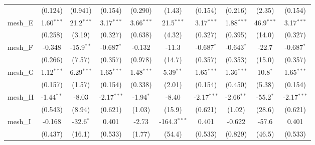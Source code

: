 \begin{tabular}{lccccccccc}
                                                               & (0.124)        & (0.941)        & (0.154)       & (0.290)       & (1.43)         & (0.154)       & (0.216)        & (2.35)        & (0.154)\\   
   mesh\_E                                                     & 1.60$^{***}$   & 21.2$^{***}$   & 3.17$^{***}$  & 3.66$^{***}$  & 21.5$^{***}$   & 3.17$^{***}$  & 1.88$^{***}$   & 46.9$^{***}$  & 3.17$^{***}$\\   
                                                               & (0.258)        & (3.19)         & (0.327)       & (0.638)       & (4.32)         & (0.327)       & (0.395)        & (14.0)        & (0.327)\\   
   mesh\_F                                                     & -0.348         & -15.9$^{**}$   & -0.687$^{*}$  & -0.132        & -11.3          & -0.687$^{*}$  & -0.643$^{*}$   & -22.7         & -0.687$^{*}$\\   
                                                               & (0.266)        & (7.57)         & (0.357)       & (0.978)       & (14.7)         & (0.357)       & (0.353)        & (15.0)        & (0.357)\\   
   mesh\_G                                                     & 1.12$^{***}$   & 6.29$^{***}$   & 1.65$^{***}$  & 1.48$^{***}$  & 5.39$^{**}$    & 1.65$^{***}$  & 1.36$^{***}$   & 10.8$^{*}$    & 1.65$^{***}$\\   
                                                               & (0.157)        & (1.57)         & (0.154)       & (0.338)       & (2.01)         & (0.154)       & (0.450)        & (5.38)        & (0.154)\\   
   mesh\_H                                                     & -1.44$^{**}$   & -8.03          & -2.17$^{***}$ & -1.94$^{*}$   & -8.40          & -2.17$^{***}$ & -2.66$^{**}$   & -55.2$^{*}$   & -2.17$^{***}$\\   
                                                               & (0.543)        & (8.94)         & (0.621)       & (1.03)        & (15.9)         & (0.621)       & (1.02)         & (28.6)        & (0.621)\\   
   mesh\_I                                                     & -0.168         & -32.6$^{*}$    & 0.401         & -2.73         & -164.3$^{***}$ & 0.401         & -0.622         & -57.6         & 0.401\\   
                                                               & (0.437)        & (16.1)         & (0.533)       & (1.77)        & (54.4)         & (0.533)       & (0.829)        & (46.5)        & (0.533)\\   

\end{tabular}
